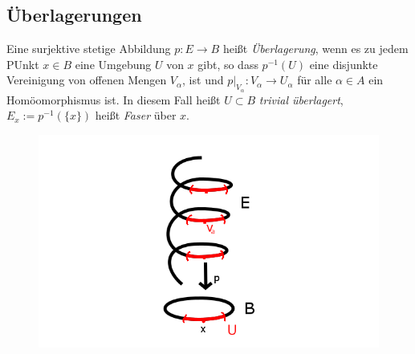 \documentclass[a4paper,10pt]{scrartcl}
\begin{document}
\subsection{Überlagerungen}
\begin{df}
 Eine surjektive stetige Abbildung $p: E\to B$ heißt \emph{Überlagerung}, wenn es zu jedem PUnkt $x\in B$ eine Umgebung $U$ von $x$ gibt, so dass $p^{-1}(U)$ eine disjunkte Vereinigung von offenen Mengen $V_\alpha$, ist und $p|_{V_\alpha}: V_\alpha\to U_\alpha$ für alle $\alpha\in A$ ein Homöomorphismus ist. In diesem Fall heißt $U\subset B$ \emph{trivial überlagert}, $E_x:=p^{-1}(\{x\})$ heißt \emph{Faser} über $x$.

\begin{figure}[ht]
\centering
\includegraphics[scale=0.3]{fig68.png}
\fixme[fig69]
\end{figure}


\end{df}
\end{document}
